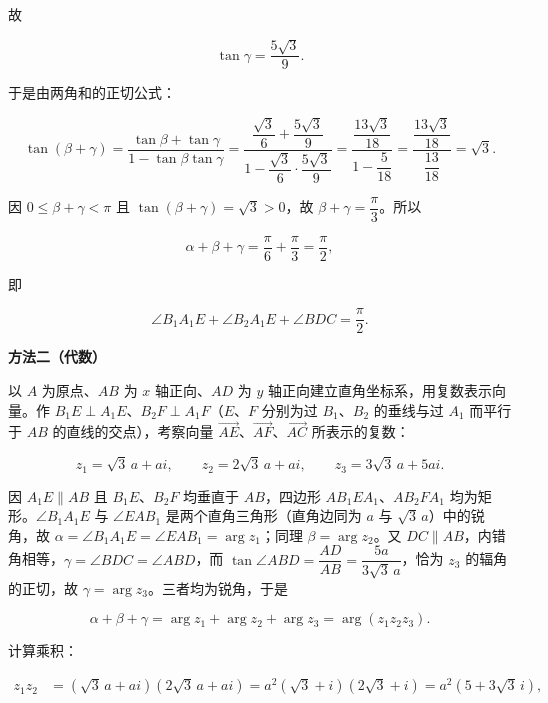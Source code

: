 \begin{answer}
故

\nopagebreak[4]
\[
\tan\gamma=\frac{5\sqrt3}{9}.
\]

于是由两角和的正切公式：

\nopagebreak[4]
\[
\tan(\beta+\gamma)=\frac{\tan\beta+\tan\gamma}{1-\tan\beta\tan\gamma}
=\frac{\dfrac{\sqrt3}{6}+\dfrac{5\sqrt3}{9}}{1-\dfrac{\sqrt3}{6}\cdot\dfrac{5\sqrt3}{9}}
=\frac{\dfrac{13\sqrt3}{18}}{1-\dfrac{5}{18}}
=\frac{\dfrac{13\sqrt3}{18}}{\dfrac{13}{18}}
=\sqrt3.
\]

因 $0\leqslant\beta+\gamma<\pi$ 且 $\tan(\beta+\gamma)=\sqrt3>0$，故 $\beta+\gamma=\dfrac{\pi}{3}$。所以

\nopagebreak[4]
\[
\alpha+\beta+\gamma=\frac{\pi}{6}+\frac{\pi}{3}=\frac{\pi}{2},
\]

即

\nopagebreak[4]
\[
\angle B_1A_1E+\angle B_2A_1E+\angle BDC=\frac{\pi}{2}.
\]

\textbf{方法二（代数）}

以 $A$ 为原点、$AB$ 为 $x$ 轴正向、$AD$ 为 $y$ 轴正向建立直角坐标系，用复数表示向量。作 $B_1E\perp A_1E$、$B_2F\perp A_1F$（$E\text{、}F$ 分别为过 $B_1\text{、}B_2$ 的垂线与过 $A_1$ 而平行于 $AB$ 的直线的交点），考察向量 $\overrightarrow{AE}$、$\overrightarrow{AF}$、$\overrightarrow{AC}$ 所表示的复数：

\nopagebreak[4]
\[
z_1=\sqrt3\,a+ai,
\qquad
z_2=2\sqrt3\,a+ai,
\qquad
z_3=3\sqrt3\,a+5ai.
\]

因 $A_1E\parallel AB$ 且 $B_1E\text{、}B_2F$ 均垂直于 $AB$，四边形 $AB_1EA_1$、$AB_2FA_1$ 均为矩形。$\angle B_1A_1E$ 与 $\angle EAB_1$ 是两个直角三角形（直角边同为 $a$ 与 $\sqrt3\,a$）中的锐角，故 $\alpha=\angle B_1A_1E=\angle EAB_1=\arg z_1$；同理 $\beta=\arg z_2$。又 $DC\parallel AB$，内错角相等，$\gamma=\angle BDC=\angle ABD$，而 $\tan\angle ABD=\dfrac{AD}{AB}=\dfrac{5a}{3\sqrt3\,a}$，恰为 $z_3$ 的辐角的正切，故 $\gamma=\arg z_3$。三者均为锐角，于是

\nopagebreak[4]
\[
\alpha+\beta+\gamma=\arg z_1+\arg z_2+\arg z_3=\arg(z_1z_2z_3).
\]

计算乘积：

\nopagebreak[4]
\[
\begin{aligned}
z_1z_2
&=(\sqrt3\,a+ai)(2\sqrt3\,a+ai)
=a^2(\sqrt3+i)(2\sqrt3+i)
=a^2\left(5+3\sqrt3\,i\right),
\end{aligned}
\]


\end{answer}
